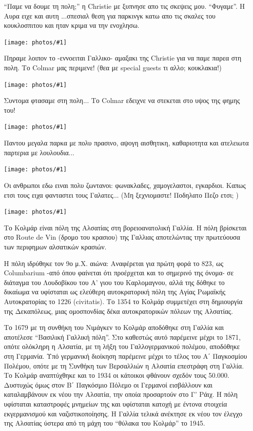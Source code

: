 \documentclass[11pt, letterpaper]{book}
\newcommand\photo[1]{\noindent\texttt{[image: photos/\#1]}}
\begin{document}
``Παμε να δουμε τη πολη;'' η Christie με ξυπνησε απο τις σκεψεις μου. ``Φυγαμε''.
Η Αυρα ειχε και αυτη ...σπεσιαλ θεση για παρκινγκ κατω απο τις σκαλες του κουκλοσπιτου και ηταν κριμα να την ενοχλησω.

\photo{88.jpg}

Πηραμε λοιπον το -εννοειται Γαλλικο- αμαξακι της Christie για να παμε παρεα στη πολη.
Το Colmar μας περιμενε! (θεα με special guests τι αλλο; κουκλακια!)  

\photo{89.jpg}

Συντομα φτασαμε στη πολη... Το Colmar εδειχνε να στεκεται στο υψος της φημης του!

\photo{90.jpg}

Παντου μεγαλα παρκα με πολυ πρασινο, αψογη αισθητικη, καθαριοτητα και ατελειωτα παρτερια με λουλουδια...

\photo{91.jpg}

Οι ανθρωποι εδω ειναι πολυ ζωντανοι: φωνακλαδες, χαμογελαστοι, εγκαρδιοι. Καπως ετσι τους ειχα φανταστει τους Γαλατες...
(Μη ξεχνιομαστε! Ποδηλατο Πεζο ετσι; )

\photo{92.jpg}

Το Κολμάρ είναι πόλη της Αλσατίας στη βορειοανατολική Γαλλία. Η πόλη βρίσκεται στο Route de Vin (δρομο του κρασιου) της Γαλλιας αποτελώντας την πρωτεύουσα των περιφημων αλσατικών κρασιών.

Η πόλη ιδρύθηκε τον 9ο μ.Χ. αιώνα: Αναφέρεται για πρώτη φορά το 823, ως Columbarium -από όπου φαίνεται ότι προέρχεται και το σημερινό της όνομα- σε διάταγμα του Λουδοβίκου του Α' γιου του Καρλομαγνου, αλλά της δόθηκε το δικαίωμα να υφίσταται ως ελεύθερη αυτοκρατορική πόλη της Αγίας Ρωμαϊκής Αυτοκρατορίας το 1226 (civitatis). Το 1354 το Κολμάρ συμμετέχει στη δημιουργία της Δεκαπόλεως, μιας ομοσπονδίας δέκα αυτοκρατορικών πόλεων της Αλσατίας.

Το 1679 με τη συνθήκη του Νιμάγκεν το Κολμάρ αποδόθηκε στη Γαλλία και αποτέλεσε ``Βασιλική Γαλλική πόλη''. Στο καθεστώς αυτό παρέμεινε μέχρι το 1871, οπότε ολόκληρη η Αλσατία, με τη λήξη του Γαλλογερμανικού πολέμου, αποδόθηκε στη Γερμανία. Υπό γερμανική διοίκηση παρέμεινε μέχρι το τέλος του Α΄ Παγκοσμίου Πολέμου, οπότε με τη Συνθήκη των Βερσαλλιών η Αλσατία επεστράφη στη Γαλλία. Το Κολμάρ αναπτύχθηκε και το 1934 οι κάτοικοι φθάνουν σχεδόν τους 50.000.
Δυστυχώς όμως στον Β΄ Παγκόσμιο Πόλεμο οι Γερμανοί εισβάλλουν και καταλαμβάνουν εκ νέου την Αλσατία, την οποία προσαρτούν στο Γ' Ράιχ. Η πόλη υφίσταται καταστροφές μνημείων της και υφίσταται κατοχή με έντονα στοιχεία εκγερμανισμού και ναζιστικοποίησης. Η Γαλλία τελικά ανέκτησε εκ νέου τον έλεγχο της Αλσατίας ύστερα από τη μάχη του ``θύλακα του Κολμάρ'' το 1945.
\end{document}
